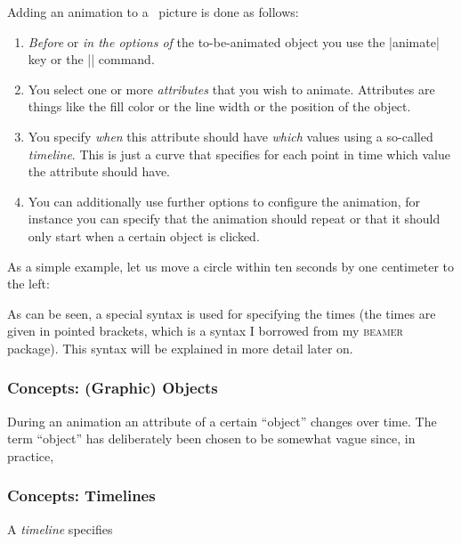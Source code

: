 Adding an animation to a \tikzname\ picture is done as follows:

\begin{enumerate}
\item \emph{Before} or \emph{in the options of} the to-be-animated
  object you use the |animate| key or the |\animate| command. 
\item You select one or more \emph{attributes} that you wish to
  animate. Attributes are things like the fill color or the line width
  or the position of the object.
\item You specify \emph{when} this attribute should have \emph{which}
  values using a so-called \emph{timeline}. This is just a curve that
  specifies for each point in time which value the attribute should
  have.
\item You can additionally use further options to configure
  the animation, for instance you can specify that the animation
  should repeat or that it should only start when a certain object is
  clicked. 
\end{enumerate}

As a simple example, let us move a circle within ten seconds by one
centimeter to the left:

\begin{codeexample}[]
\end{codeexample}

As can be seen, a special syntax is used for specifying the times (the
times are given in pointed brackets, which is a syntax I borrowed from
my \textsc{beamer} package). This syntax will be explained in more
detail later on. 


\subsubsection{Concepts: (Graphic) Objects}

During an animation an attribute of a certain ``object''
changes over time. The term ``object'' has deliberately been chosen to
be somewhat vague since, in practice, 


\subsubsection{Concepts: Timelines}

A \emph{timeline} specifies 



\endinput


